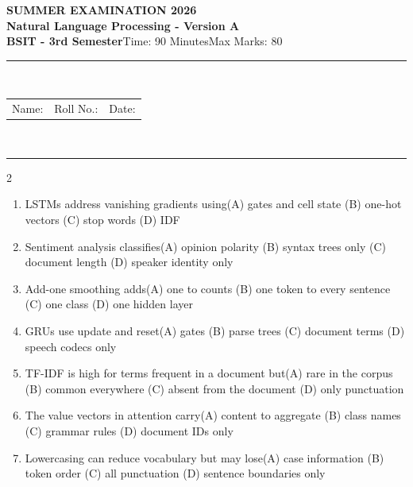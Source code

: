 \documentclass[a4paper]{article}
\makeatletter
\newcommand{\examheader}{%
\begin{center}\textbf{\large SUMMER EXAMINATION 2026}\\[-1pt]
\textbf{\normalsize Natural Language Processing - Version A}\\[-1pt]
\textbf{BSIT - 3rd Semester}\quad Time: 90 Minutes\quad Max Marks: 80\\[-1pt]
\textcolor{black!65}{\rule{\linewidth}{0.45pt}}\\[-2pt]
\begin{tabularx}{\linewidth}{@{}X X X@{}}Name: \hrulefill & Roll No.: \hrulefill & Date: \hrulefill\end{tabularx}\\[-1pt]
\textcolor{black!65}{\rule{\linewidth}{0.45pt}}\end{center}}
\makeatother
\begin{document}
\examheader
\raggedcolumns
\begin{multicols*}{2}
\fontsize{8.5}{10}\selectfont
\begin{enumerate}
\item LSTMs address vanishing gradients using\newline\hspace*{0.6em}(A) gates and cell state \quad (B) one-hot vectors \newline\hspace*{0.6em}(C) stop words \quad (D) IDF
\item Sentiment analysis classifies\newline\hspace*{0.6em}(A) opinion polarity \quad (B) syntax trees only \newline\hspace*{0.6em}(C) document length \quad (D) speaker identity only
\item Add-one smoothing adds\newline\hspace*{0.6em}(A) one to counts \quad (B) one token to every sentence \newline\hspace*{0.6em}(C) one class \quad (D) one hidden layer
\item GRUs use update and reset\newline\hspace*{0.6em}(A) gates \quad (B) parse trees \newline\hspace*{0.6em}(C) document terms \quad (D) speech codecs only
\item TF-IDF is high for terms frequent in a document but\newline\hspace*{0.6em}(A) rare in the corpus \quad (B) common everywhere \newline\hspace*{0.6em}(C) absent from the document \quad (D) only punctuation
\item The value vectors in attention carry\newline\hspace*{0.6em}(A) content to aggregate \quad (B) class names \newline\hspace*{0.6em}(C) grammar rules \quad (D) document IDs only
\item Lowercasing can reduce vocabulary but may lose\newline\hspace*{0.6em}(A) case information \quad (B) token order \newline\hspace*{0.6em}(C) all punctuation \quad (D) sentence boundaries only

\end{enumerate}
\end{multicols*}
\end{document}
